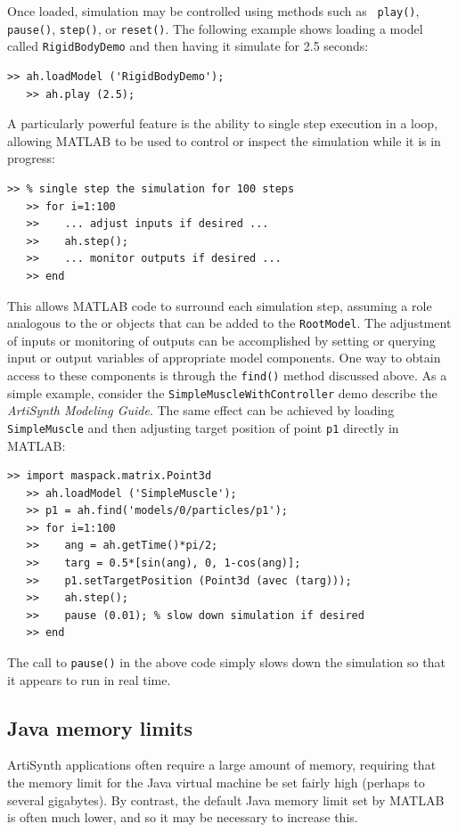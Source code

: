 \documentclass{article}
\begin{document}
Once loaded, simulation may be controlled using methods such as {\tt
play()}, {\tt pause()}, {\tt step()}, or {\tt reset()}. The following
example shows loading a model called {\tt RigidBodyDemo} and
then having it simulate for 2.5 seconds:
%
\begin{lstlisting}[]
   >> ah.loadModel ('RigidBodyDemo');
   >> ah.play (2.5);
\end{lstlisting}
%
A particularly powerful feature is the ability to single step
execution in a loop, allowing MATLAB to be used to control or inspect
the simulation while it is in progress:
%
\begin{lstlisting}[]
   >> % single step the simulation for 100 steps
   >> for i=1:100
   >>    ... adjust inputs if desired ...
   >>    ah.step();
   >>    ... monitor outputs if desired ...
   >> end
\end{lstlisting}
%
This allows MATLAB code to surround each simulation step, assuming a
role analogous to the 
or  objects that can be
added to the {\tt RootModel}.  The adjustment of inputs or monitoring
of outputs can be accomplished by setting or querying input or output
variables of appropriate model components. One way to obtain access to
these components is through the {\tt find()} method discussed above.
As a simple example, consider the {\tt SimpleMuscleWithController}
demo describe the {\it ArtiSynth Modeling Guide}. The same effect
can be achieved by loading {\tt SimpleMuscle} and then adjusting
target position of point {\tt p1} directly in MATLAB:
%
\begin{lstlisting}[]
   >> import maspack.matrix.Point3d
   >> ah.loadModel ('SimpleMuscle');
   >> p1 = ah.find('models/0/particles/p1');
   >> for i=1:100
   >>    ang = ah.getTime()*pi/2;
   >>    targ = 0.5*[sin(ang), 0, 1-cos(ang)];
   >>    p1.setTargetPosition (Point3d (avec (targ)));
   >>    ah.step();
   >>    pause (0.01); % slow down simulation if desired
   >> end
\end{lstlisting}
%
The call to {\tt pause()} in the above code simply slows down the
simulation so that it appears to run in real time.

\subsection{Java memory limits}
\label{memoryLimits:sec}

ArtiSynth applications often require a large amount of memory,
requiring that the memory limit for the Java virtual machine
be set fairly high (perhaps to several gigabytes). By contrast, the
default Java memory limit set by MATLAB is often much lower, and so it
may be necessary to increase this.
\end{document}
